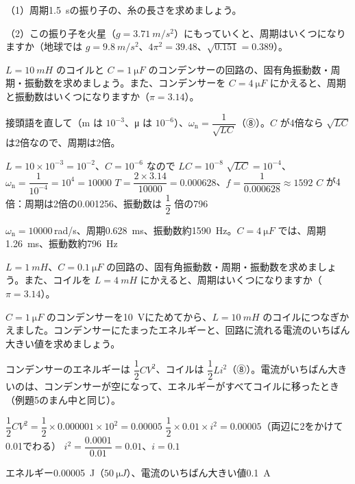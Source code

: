 \begin{jibun}
（1）周期\qty{1.5}{s}の振り子の、糸の長さを求めましょう。\par
（2）この振り子を火星（$g=\qty{3.71}{m/s^2}$）にもっていくと、周期はいくつになりますか（地球では $g=\qty{9.8}{m/s^2}$、$4\pi^2=39.48$、$\sqrt{0.151}=0.389$）。
\end{jibun}

\begin{reidai}[コイルとコンデンサーの回路の周期]
$L=\qty{10}{mH}$ のコイルと $C=\qty{1}{\micro F}$ のコンデンサーの回路の、固有角振動数・周期・振動数を求めましょう。また、コンデンサーを $C=\qty{4}{\micro F}$ にかえると、周期と振動数はいくつになりますか（$\pi=3.14$）。\par
\kangaekata 接頭語を直して（m は $10^{-3}$、μ は $10^{-6}$）、$\omega_{\mathrm n}=\dfrac{1}{\sqrt{LC}}$（⑧）。$C$ が4倍なら $\sqrt{LC}$ は2倍なので、周期は2倍。\par
\shiki
\kviga $L=10\times10^{-3}=10^{-2}$、$C=10^{-6}$ なので $LC=10^{-8}$
\kviga $\sqrt{LC}=10^{-4}$、$\omega_{\mathrm n}=\dfrac{1}{10^{-4}}=10^4=\num{10000}$
\kviga $T=\dfrac{2\times3.14}{\num{10000}}=0.000628$、$f=\dfrac{1}{0.000628}\approx1592$
\kviga $C$ が4倍：周期は2倍の0.001256、振動数は $\dfrac{1}{2}$ 倍の796\par
\kotae $\omega_{\mathrm n}=\num{10000}$\,rad/s、周期\qty{0.628}{ms}、振動数約\qty{1590}{Hz}。$C=\qty{4}{\micro F}$ では、周期\qty{1.26}{ms}、振動数約\qty{796}{Hz}
\end{reidai}

\begin{jibun}
$L=\qty{1}{mH}$、$C=\qty{0.1}{\micro F}$ の回路の、固有角振動数・周期・振動数を求めましょう。また、コイルを $L=\qty{4}{mH}$ にかえると、周期はいくつになりますか（$\pi=3.14$）。
\end{jibun}

\begin{reidai}
$C=\qty{1}{\micro F}$ のコンデンサーを\qty{10}{V}にためてから、$L=\qty{10}{mH}$ のコイルにつなぎかえました。コンデンサーにたまったエネルギーと、回路に流れる電流のいちばん大きい値を求めましょう。\par
\kangaekata コンデンサーのエネルギーは $\dfrac{1}{2}CV^2$、コイルは $\dfrac{1}{2}Li^2$（⑧）。電流がいちばん大きいのは、コンデンサーが空になって、エネルギーがすべてコイルに移ったとき（例題5のまん中と同じ）。\par
\shiki
\kviga $\dfrac{1}{2}CV^2=\dfrac{1}{2}\times0.000001\times10^2=0.00005$
\kviga $\dfrac{1}{2}\times0.01\times i^2=0.00005$（両辺に2をかけて0.01でわる）
\kviga $i^2=\dfrac{0.0001}{0.01}=0.01$、$i=0.1$\par
\kotae エネルギー\qty{0.00005}{J}（$\qty{50}{\micro J}$）、電流のいちばん大きい値\qty{0.1}{A}
\end{reidai}

